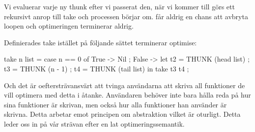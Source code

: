 \documentclass[../Optimise]{subfiles}
\begin{document}
Vi evaluerar varje ny thunk efter vi passerat den, när vi kommer till 
 görs ett rekursivt anrop till take och processen börjar om.
 får aldrig en chans att avbryta loopen och optimeringen terminerar aldrig.

Definierades take istället på följande sättet terminerar optimise:

\begin{codeEx}
take n list = case n == 0 of
    { True -> Nil
    ; False -> let 
        { t2 = THUNK (head list)
        ; t3 = THUNK (n - 1)
        ; t4 = THUNK (tail list)
        } in  take t3 t4
    };
\end{codeEx}


Och det är oeftersträvansvärt att tvinga användarna att skriva all funktioner
de vill optimera med detta i åtanke. Användaren behöver inte bara hålla reda på 
hur sina funktioner är skrivan, men också hur alla funktioner han använder är skrivna. 
Detta arbetar emot principen om abstraktion vilket är oturligt. Detta leder oss in på vår strävan
efter en lat optimeringssemantik.
\end{document}
